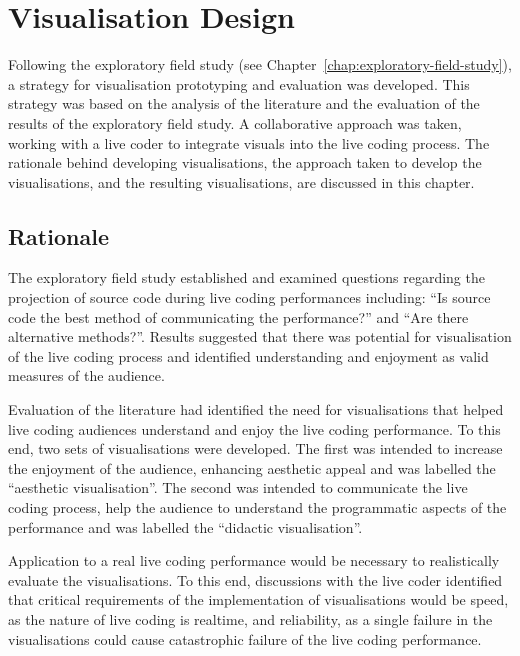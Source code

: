 
\chapter{Visualisation Design}
\label{chap:visualisation-design}

Following the exploratory field study (see Chapter~\ref{chap:exploratory-field-study}), a strategy for visualisation prototyping and evaluation was developed. This strategy was based on the analysis of the literature and the evaluation of the results of the exploratory field study. A collaborative approach was taken, working with a live coder to integrate visuals into the live coding process. The rationale behind developing visualisations, the approach taken to develop the visualisations, and the resulting visualisations, are discussed in this chapter.

\section{Rationale}

The exploratory field study established and examined questions regarding the projection of source code during live coding performances including: ``Is source code the best method of communicating the performance?'' and ``Are there alternative methods?''. Results suggested that there was potential for visualisation of the live coding process and identified understanding and enjoyment as valid measures of the audience.

Evaluation of the literature had identified the need for visualisations that helped live coding audiences understand and enjoy the live coding performance. To this end, two sets of visualisations were developed. The first was intended to increase the enjoyment of the audience, enhancing aesthetic appeal and was labelled the ``aesthetic visualisation''. The second was intended to communicate the live coding process, help the audience to understand the programmatic aspects of the performance and was labelled the ``didactic visualisation''.

Application to a real live coding performance would be necessary to realistically evaluate the visualisations. To this end, discussions with the live coder identified that critical requirements of the implementation of visualisations would be speed, as the nature of live coding is realtime, and reliability, as a single failure in the visualisations could cause catastrophic failure of the live coding performance. 

